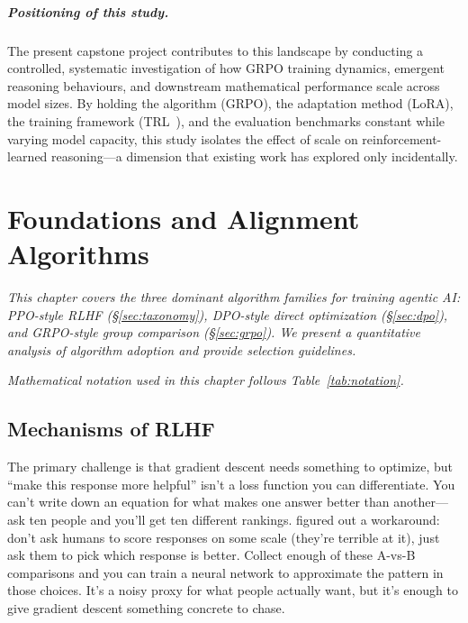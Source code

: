 \documentclass[12pt,a4paper]{report}
\theoremstyle{definition}
\begin{document}
\paragraph{Positioning of this study.} The present capstone project contributes to this landscape by conducting a controlled, systematic investigation of how GRPO training dynamics, emergent reasoning behaviours, and downstream mathematical performance scale across model sizes. By holding the algorithm (GRPO), the adaptation method (LoRA), the training framework (TRL~\cite{vonwerra2022trl}), and the evaluation benchmarks constant while varying model capacity, this study isolates the effect of scale on reinforcement-learned reasoning---a dimension that existing work has explored only incidentally.





\chapter{Foundations and Alignment Algorithms}
\label{ch:foundations}

\textit{This chapter covers the three dominant algorithm families for training agentic AI: PPO-style RLHF (\S\ref{sec:taxonomy}), DPO-style direct optimization (\S\ref{sec:dpo}), and GRPO-style group comparison (\S\ref{sec:grpo}). We present a quantitative analysis of algorithm adoption and provide selection guidelines.}

\vspace{0.3cm}

\noindent\textit{Mathematical notation used in this chapter follows Table~\ref{tab:notation}.}

\section{Mechanisms of RLHF}
The primary challenge is that gradient descent needs something to optimize, but ``make this response more helpful'' isn't a loss function you can differentiate. You can't write down an equation for what makes one answer better than another---ask ten people and you'll get ten different rankings. \citet{christiano2017deep} figured out a workaround: don't ask humans to score responses on some scale (they're terrible at it), just ask them to pick which response is better. Collect enough of these A-vs-B comparisons and you can train a neural network to approximate the pattern in those choices. It's a noisy proxy for what people actually want, but it's enough to give gradient descent something concrete to chase.
\end{document}
